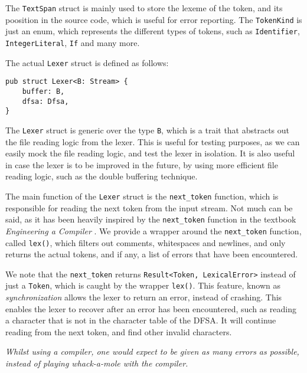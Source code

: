 \documentclass{article}
\newcommand{\code}[1]{\texttt{#1}}
\begin{document}
The \code{TextSpan} struct is mainly used to store the lexeme of the token, and
its poosition in the source code, which is useful for error reporting. The
\code{TokenKind} is just an enum, which represents the different types of tokens, such as \code{Identifier},
\code{IntegerLiteral}, \code{If} and many more.


The actual \code{Lexer} struct is defined as follows:

\begin{mainbox}{}
    \lstset{belowskip=0pt, aboveskip=0pt}
    \begin{lstlisting}[caption={The \code{Lexer} struct.}]
pub struct Lexer<B: Stream> {
    buffer: B,
    dfsa: Dfsa,
}
    \end{lstlisting}
\end{mainbox}

The \code{Lexer} struct is generic over the type \code{B}, which is a trait that
abstracts out the file reading logic from the lexer. This is useful for testing
purposes, as we can easily mock the file reading logic, and test the lexer in
isolation. It is also useful in case the lexer is to be improved in the future,
by using more efficient file reading logic, such as the double buffering
technique.

The main function of the \code{Lexer} struct is the \code{next\_token} function,
which is responsible for reading the next token from the input stream. Not much
can be said, as it has been heavily inspired by the \code{next\_token} function
in the textbook \textit{Engineering a Compiler} \cite{engineering-a-compiler}.
We provide a wrapper around the \code{next\_token} function, called
\code{lex()}, which filters out comments, whitespaces and newlines, and only
returns the actual tokens, and if any, a list of errors that have been
encountered.


We note that the \code{next\_token} returns \code{Result<Token, LexicalError>}
instead of just a \code{Token}, which is caught by the wrapper \code{lex()}.
This feature, known as \textit{synchronization} allows the lexer to return an
error, instead of crashing. This enables the lexer to recover after an error has
been encountered, such as reading a character that is not in the character table
of the DFSA. It will continue reading from the next token, and find other
invalid characters.

\begin{center}
    \textit{Whilst using a compiler, one would expect to
        be given as many errors as possible, instead of
        playing whack-a-mole with the compiler.}
\end{center}
\end{document}

